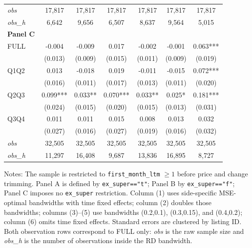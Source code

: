 \begin{table}[!htbp]
\begin{tabular}{lcccccc}
\textit{obs} & 17,817 & 17,817 & 17,817 & 17,817 & 17,817 & 17,817 \\
\textit{obs\_h} & 6,642 & 9,656 & 6,507 & 8,637 & 9,564 & 5,015 \\

\textbf{Panel C} &&&&&&  \\

FULL & -0.004 & -0.009 & 0.017 & -0.002 & -0.001 & 0.063*** \\
 & (0.013) & (0.009) & (0.015) & (0.011) & (0.009) & (0.019) \\
Q1Q2 & 0.013 & -0.018 & 0.019 & -0.011 & -0.015 & 0.072*** \\
 & (0.016) & (0.011) & (0.017) & (0.013) & (0.011) & (0.020) \\
Q2Q3 & 0.099*** & 0.033** & 0.070*** & 0.033** & 0.025* & 0.181*** \\
 & (0.024) & (0.015) & (0.020) & (0.015) & (0.013) & (0.031) \\
Q3Q4 & 0.011 & 0.011 & 0.015 & 0.008 & 0.013 & 0.032 \\
 & (0.027) & (0.016) & (0.027) & (0.019) & (0.016) & (0.032) \\

\textit{obs} & 32,505 & 32,505 & 32,505 & 32,505 & 32,505 & 32,505 \\
\textit{obs\_h} & 11,297 & 16,408 &  9,687 & 13,836 & 16,895 &  8,727 \\

\bottomrule
\end{tabular}
\begin{minipage}{0.98\textwidth}\footnotesize
Notes: The sample is restricted to \texttt{first\_month\_ltm} $\geq 1$ before price and change trimming. Panel A is defined by \texttt{ex\_super=="t"}; Panel B by \texttt{ex\_super=="f"}; Panel C imposes no \texttt{ex\_super} restriction. Column (1) uses side-specific MSE-optimal bandwidths with time fixed effects; column (2) doubles those bandwidths; columns (3)--(5) use bandwidths (0.2,0.1), (0.3,0.15), and (0.4,0.2); column (6) omits time fixed effects. Standard errors are clustered by listing ID. Both observation rows correspond to FULL only: \textit{obs} is the raw sample size and \textit{obs\_h} is the number of observations inside the RD bandwidth.
\end{minipage}
\end{table}
\clearpage
